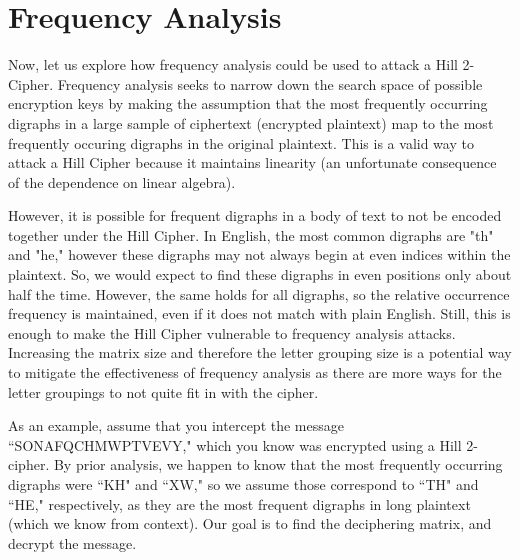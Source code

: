 \documentclass{article}
\begin{document}
\section{Frequency Analysis}
Now, let us explore how frequency analysis could be used to attack a Hill 2-Cipher. Frequency analysis seeks to narrow down the search space of possible encryption keys by making the assumption that the most frequently occurring digraphs in a large sample of ciphertext (encrypted plaintext) map to the most frequently occuring digraphs in the original plaintext. This is a valid way to attack a Hill Cipher because it maintains linearity (an unfortunate consequence of the dependence on linear algebra). \medskip

\noindent However, it is possible for frequent digraphs in a body of text to not be encoded together under the Hill Cipher. In English, the most common digraphs are "th" and "he," however these digraphs may not always begin at even indices within the plaintext. So, we would expect to find these digraphs in even positions only about half the time. However, the same holds for all digraphs, so the relative occurrence frequency is maintained, even if it does not match with plain English. Still, this is enough to make the Hill Cipher vulnerable to frequency analysis attacks. Increasing the matrix size and therefore the letter grouping size is a potential way to mitigate the effectiveness of frequency analysis as there are more ways for the letter groupings to not quite fit in with the cipher. \medskip

\noindent As an example, assume that you intercept the message ``SONAFQCHMWPTVEVY," which you know was encrypted using a Hill 2-cipher. By prior analysis, we happen to know that the most frequently occurring digraphs were ``KH" and ``XW," so we assume those correspond to ``TH" and ``HE," respectively, as they are the most frequent digraphs in long plaintext (which we know from context). Our goal is to find the deciphering matrix, and decrypt the message. \medskip
\end{document}
